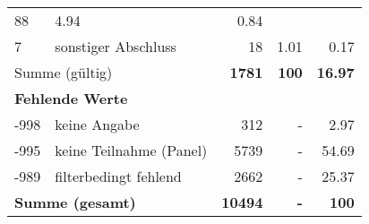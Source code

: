 \begin{longtable}{lXrrr}
       \num{88} &
       \num[round-mode=places,round-precision=2]{4,94} &
         \num[round-mode=places,round-precision=2]{0,84} \\

     7 &
     \multicolumn{1}{X}{ sonstiger Abschluss   } &


       \num{18} &
       \num[round-mode=places,round-precision=2]{1,01} &
         \num[round-mode=places,round-precision=2]{0,17} \\
     \midrule
     \multicolumn{2}{l}{Summe (gültig)} &
       \textbf{\num{1781}} &
     \textbf{100} &
       \textbf{\num[round-mode=places,round-precision=2]{16,97}} \\
     \multicolumn{5}{l}{\textbf{Fehlende Werte}}\\
       -998 &
       keine Angabe &
         \num{312} &
        - &
         \num[round-mode=places,round-precision=2]{2,97} \\
       -995 &
       keine Teilnahme (Panel) &
         \num{5739} &
        - &
         \num[round-mode=places,round-precision=2]{54,69} \\
       -989 &
       filterbedingt fehlend &
         \num{2662} &
        - &
         \num[round-mode=places,round-precision=2]{25,37} \\
     \midrule
     \multicolumn{2}{l}{\textbf{Summe (gesamt)}} &
          \textbf{\num{10494}} &
        \textbf{-} &
        \textbf{100} \\
     \bottomrule
     \end{longtable}
     
